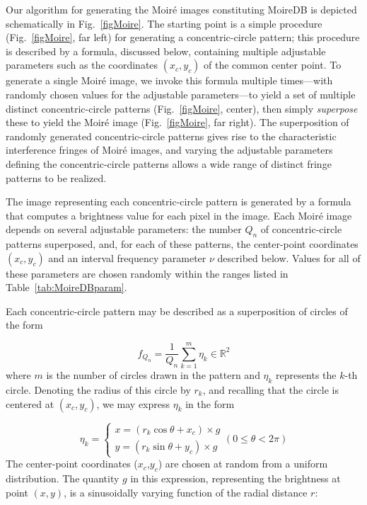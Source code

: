 Our algorithm for generating the Moir\'e images constituting
MoireDB is depicted schematically in Fig.~\ref{figMoire}.
The starting point is a simple procedure
(Fig.~\ref{figMoire}, far left) for generating a
concentric-circle pattern; this procedure is described
by a formula, discussed below, containing multiple
adjustable parameters such as the coordinates 
$(x_c,y_c)$ of the common center point.
To generate a single Moir\'e image, we invoke this 
formula multiple times---with randomly chosen values
for the adjustable parameters---to yield a set 
of multiple distinct concentric-circle patterns 
(Fig.~\ref{figMoire}, center), then simply \textit{superpose}
these to yield the Moir\'e image (Fig.~\ref{figMoire}, far right).
The superposition of randomly generated
concentric-circle patterns gives rise to the characteristic
interference fringes of Moir\'e images, and varying the
adjustable parameters defining the concentric-circle
patterns allows a wide range of distinct fringe patterns to be
realized.

The image representing each concentric-circle pattern is generated
by a formula that computes a brightness value for each pixel in the image.
Each Moir\'e image depends on several adjustable parameters:
the number $Q_n$ of concentric-circle patterns superposed, and,
for each of these patterns, the center-point coordinates $(x_c, y_c)$
and an interval frequency parameter $\nu$ described below.
Values for all of these parameters are chosen randomly within
the ranges listed in Table~\ref{tab:MoireDBparam}.
 
Each concentric-circle pattern may be described as a superposition
of circles of the form

\begin{equation}
f_{Q_n}=\frac{1}{Q_n}\sum^{m}_{k=1}\eta_k\in\mathbb{R}^2
\end{equation}
%
where $m$ is the number of circles drawn in the pattern
and $\eta_k$ represents the $k$-th circle. Denoting the radius of 
this circle by $r_k$, and recalling that the circle is centered
at $(x_c,y_c)$, we may express $\eta_k$ in the form 

\begin{equation}
  \eta_k=
  \left\{
    \begin{array}{l}
      x=(r_k\cos{\theta}+x_c)\times g \\
      y=(r_k\sin{\theta}+y_c)\times g
    \end{array}
  \right.
  (0\leq\theta<2\pi)
\end{equation}
%
The center-point coordinates ($x_c$,$y_c$) are chosen at random from 
a uniform distribution.
The quantity $g$ in this expression, representing the brightness
at point $(x,y)$, is a sinusoidally varying function of the
radial distance $r$:

